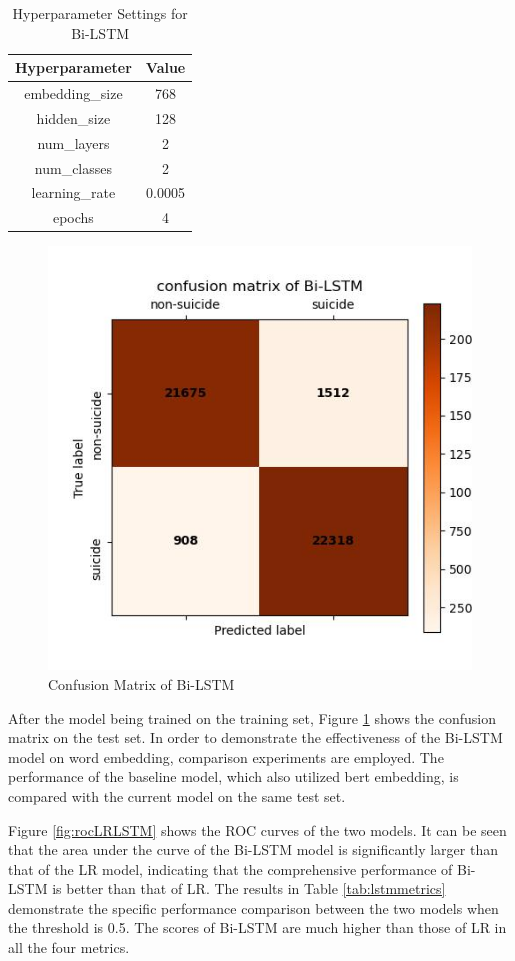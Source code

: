 \documentclass[ %
                    author={Bocheng Wang},
                supervisor={Dr. Qiang Liu},
                    degree={MSc},
                     title={A Research on Identification of Suicide Ideation in Texts with Multiple Models},
                      type={},
                      year={2024}]{dissertation}
\begin{document}
\begin{table}[h]
      \centering
      \begin{tabular}{cc}
            \hline
            Hyperparameter & Value \\
            \hline
            embedding\_size & 768    \\
            hidden\_size    & 128    \\
            num\_layers     & 2      \\
            num\_classes    & 2      \\
            learning\_rate  & 0.0005 \\
            epochs          & 4      \\
            \hline
      \end{tabular}
      \caption{Hyperparameter Settings for Bi-LSTM}
      \label{tab:lstmhyperparameter}
\end{table}

\begin{figure}[!h]
      \centering
      \includegraphics[width=0.4\linewidth]{../img/cm_LSTM.jpg}
      \caption{Confusion Matrix of Bi-LSTM}
      \label{fig:cm_LSTM}
\end{figure}

After the model being trained on the training set, Figure \ref{fig:cm_LSTM} shows the confusion matrix on the test set. In order to demonstrate the effectiveness of the Bi-LSTM model on word embedding, comparison experiments are employed. The performance of the baseline model, which also utilized bert embedding, is compared with the current model on the same test set.

Figure \ref{fig:rocLRLSTM} shows the ROC curves of the two models. It can be seen that the area under the curve of the Bi-LSTM model is significantly larger than that of the LR model, indicating that the comprehensive performance of Bi-LSTM is better than that of LR. The results in Table \ref{tab:lstmmetrics} demonstrate the specific performance comparison between the two models when the threshold is 0.5. The scores of Bi-LSTM are much higher than those of LR in all the four metrics.
\end{document}
